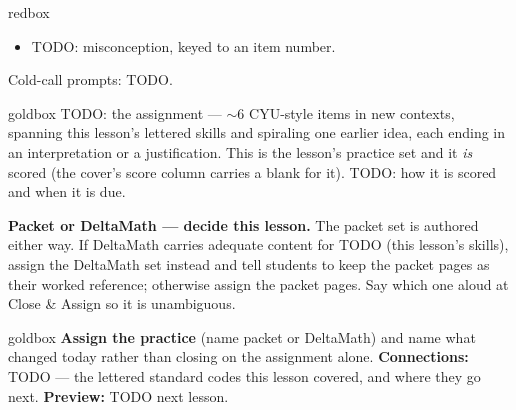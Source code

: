 \documentclass[10pt]{article}
\begin{document}
\boxguard
\begin{skillbox}{redbox}
\begin{itemize}[leftmargin=1.2em, nosep]
  \item TODO: misconception, keyed to an item number.
\end{itemize}
Cold-call prompts: TODO.
\end{skillbox}

\boxguard
\begin{skillbox}{goldbox}
TODO: the assignment --- $\sim$6 CYU-style items in new contexts, spanning this lesson's lettered
skills and spiraling one earlier idea, each ending in an interpretation or a justification. This
is the lesson's practice set and it \emph{is} scored (the cover's score column carries a blank
for it). TODO: how it is scored and when it is due.

\textbf{Packet or DeltaMath --- decide this lesson.} The packet set is authored either way. If
DeltaMath carries adequate content for TODO (this lesson's skills), assign the DeltaMath set
instead and tell students to keep the packet pages as their worked reference; otherwise assign
the packet pages. Say which one aloud at Close \& Assign so it is unambiguous.
\end{skillbox}

\boxguard
\begin{skillbox}{goldbox}
\textbf{Assign the practice} (name packet or DeltaMath) and name what changed today rather than
closing on the assignment alone.
\textbf{Connections:} TODO --- the lettered standard codes this lesson covered, and where they go next.
\textbf{Preview:} TODO next lesson.
\end{skillbox}

\begin{teachernote}[Warm-Up]
\end{teachernote}

\begin{teachernote}[Experience \& Formalize]
\end{teachernote}

\begin{teachernote}[Homework]
\end{teachernote}
\end{document}

